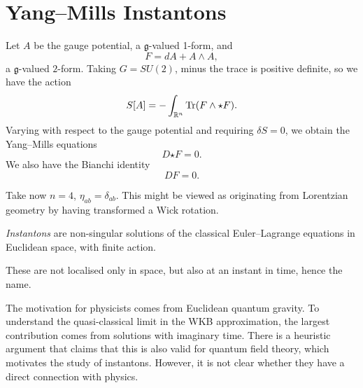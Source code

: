
\section{Yang--Mills Instantons}%
\label{sec:yang_mills_instantons}

Let $A$ be the gauge potential, a $\mathfrak{g}$-valued 1-form, and 
\begin{equation}
  \label{eq:13-F}
  F = dA + A \wedge A,
\end{equation}
a $\mathfrak{g}$-valued $2$-form.
Taking $G = SU(2)$, minus the trace is positive definite, so we have the action
\begin{equation}
  S[A] = - \int_{\mathbb{R}^n} \Tr(F \wedge \star F).
\end{equation}
Varying with respect to the gauge potential and requiring $\delta S = 0$, we obtain the Yang--Mills equations
\begin{equation}
  D {\star F} = 0.
\end{equation}
We also have the Bianchi identity
\begin{equation}
  D F = 0.
\end{equation}

Take now $n = 4$, $\eta_{ab} = \delta_{ab}$.  This might be viewed as originating from Lorentzian geometry by having transformed a Wick rotation.
\begin{definition}[instantons]
  \emph{Instantons} are non-singular solutions of the classical Euler--Lagrange equations in Euclidean space, with finite action.
\end{definition}
These are not localised only in space, but also at an instant in time, hence the name.

The motivation for physicists comes from Euclidean quantum gravity. To understand the quasi-classical limit in the WKB approximation, the largest contribution comes from solutions with imaginary time. There is a heuristic argument that claims that this is also valid for quantum field theory, which motivates the study of instantons. However, it is not clear whether they have a direct connection with physics.

